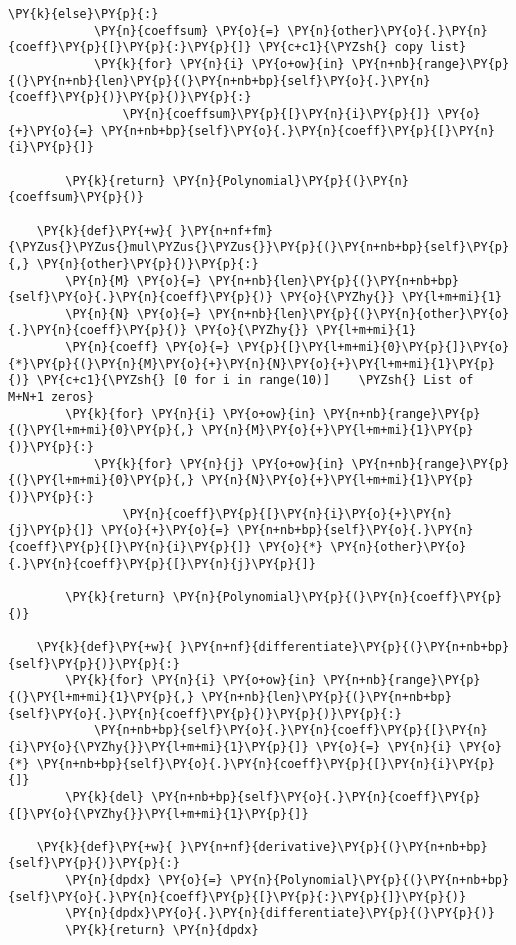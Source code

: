 \begin{example}
\begin{tcolorbox}[breakable, size=fbox, boxrule=1pt, pad at break*=1mm,colback=cellbackground, colframe=cellborder]
\begin{Verbatim}[commandchars=\\\{\}]
        \PY{k}{else}\PY{p}{:} 
            \PY{n}{coeffsum} \PY{o}{=} \PY{n}{other}\PY{o}{.}\PY{n}{coeff}\PY{p}{[}\PY{p}{:}\PY{p}{]} \PY{c+c1}{\PYZsh{} copy list}
            \PY{k}{for} \PY{n}{i} \PY{o+ow}{in} \PY{n+nb}{range}\PY{p}{(}\PY{n+nb}{len}\PY{p}{(}\PY{n+nb+bp}{self}\PY{o}{.}\PY{n}{coeff}\PY{p}{)}\PY{p}{)}\PY{p}{:}
                \PY{n}{coeffsum}\PY{p}{[}\PY{n}{i}\PY{p}{]} \PY{o}{+}\PY{o}{=} \PY{n+nb+bp}{self}\PY{o}{.}\PY{n}{coeff}\PY{p}{[}\PY{n}{i}\PY{p}{]}
            
        \PY{k}{return} \PY{n}{Polynomial}\PY{p}{(}\PY{n}{coeffsum}\PY{p}{)}

    \PY{k}{def}\PY{+w}{ }\PY{n+nf+fm}{\PYZus{}\PYZus{}mul\PYZus{}\PYZus{}}\PY{p}{(}\PY{n+nb+bp}{self}\PY{p}{,} \PY{n}{other}\PY{p}{)}\PY{p}{:}
        \PY{n}{M} \PY{o}{=} \PY{n+nb}{len}\PY{p}{(}\PY{n+nb+bp}{self}\PY{o}{.}\PY{n}{coeff}\PY{p}{)} \PY{o}{\PYZhy{}} \PY{l+m+mi}{1}
        \PY{n}{N} \PY{o}{=} \PY{n+nb}{len}\PY{p}{(}\PY{n}{other}\PY{o}{.}\PY{n}{coeff}\PY{p}{)} \PY{o}{\PYZhy{}} \PY{l+m+mi}{1}
        \PY{n}{coeff} \PY{o}{=} \PY{p}{[}\PY{l+m+mi}{0}\PY{p}{]}\PY{o}{*}\PY{p}{(}\PY{n}{M}\PY{o}{+}\PY{n}{N}\PY{o}{+}\PY{l+m+mi}{1}\PY{p}{)} \PY{c+c1}{\PYZsh{} [0 for i in range(10)]    \PYZsh{} List of M+N+1 zeros}
        \PY{k}{for} \PY{n}{i} \PY{o+ow}{in} \PY{n+nb}{range}\PY{p}{(}\PY{l+m+mi}{0}\PY{p}{,} \PY{n}{M}\PY{o}{+}\PY{l+m+mi}{1}\PY{p}{)}\PY{p}{:} 
            \PY{k}{for} \PY{n}{j} \PY{o+ow}{in} \PY{n+nb}{range}\PY{p}{(}\PY{l+m+mi}{0}\PY{p}{,} \PY{n}{N}\PY{o}{+}\PY{l+m+mi}{1}\PY{p}{)}\PY{p}{:}
                \PY{n}{coeff}\PY{p}{[}\PY{n}{i}\PY{o}{+}\PY{n}{j}\PY{p}{]} \PY{o}{+}\PY{o}{=} \PY{n+nb+bp}{self}\PY{o}{.}\PY{n}{coeff}\PY{p}{[}\PY{n}{i}\PY{p}{]} \PY{o}{*} \PY{n}{other}\PY{o}{.}\PY{n}{coeff}\PY{p}{[}\PY{n}{j}\PY{p}{]}
        
        \PY{k}{return} \PY{n}{Polynomial}\PY{p}{(}\PY{n}{coeff}\PY{p}{)}

    \PY{k}{def}\PY{+w}{ }\PY{n+nf}{differentiate}\PY{p}{(}\PY{n+nb+bp}{self}\PY{p}{)}\PY{p}{:}
        \PY{k}{for} \PY{n}{i} \PY{o+ow}{in} \PY{n+nb}{range}\PY{p}{(}\PY{l+m+mi}{1}\PY{p}{,} \PY{n+nb}{len}\PY{p}{(}\PY{n+nb+bp}{self}\PY{o}{.}\PY{n}{coeff}\PY{p}{)}\PY{p}{)}\PY{p}{:}
            \PY{n+nb+bp}{self}\PY{o}{.}\PY{n}{coeff}\PY{p}{[}\PY{n}{i}\PY{o}{\PYZhy{}}\PY{l+m+mi}{1}\PY{p}{]} \PY{o}{=} \PY{n}{i} \PY{o}{*} \PY{n+nb+bp}{self}\PY{o}{.}\PY{n}{coeff}\PY{p}{[}\PY{n}{i}\PY{p}{]}
        \PY{k}{del} \PY{n+nb+bp}{self}\PY{o}{.}\PY{n}{coeff}\PY{p}{[}\PY{o}{\PYZhy{}}\PY{l+m+mi}{1}\PY{p}{]}

    \PY{k}{def}\PY{+w}{ }\PY{n+nf}{derivative}\PY{p}{(}\PY{n+nb+bp}{self}\PY{p}{)}\PY{p}{:}
        \PY{n}{dpdx} \PY{o}{=} \PY{n}{Polynomial}\PY{p}{(}\PY{n+nb+bp}{self}\PY{o}{.}\PY{n}{coeff}\PY{p}{[}\PY{p}{:}\PY{p}{]}\PY{p}{)}
        \PY{n}{dpdx}\PY{o}{.}\PY{n}{differentiate}\PY{p}{(}\PY{p}{)}
        \PY{k}{return} \PY{n}{dpdx}
\end{Verbatim}
\end{tcolorbox}


\end{example}
